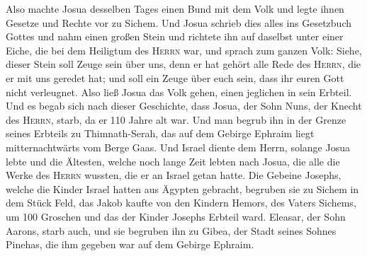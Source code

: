  Also machte Josua desselben Tages einen Bund mit dem
Volk und legte ihnen Gesetze und Rechte vor zu Sichem. 
Und Josua schrieb dies alles ins Gesetzbuch Gottes und nahm einen großen
Stein und richtete ihn auf daselbst unter einer Eiche, die bei dem
Heiligtum des \textsc{Herrn} war,  und sprach zum ganzen
Volk: Siehe, dieser Stein soll Zeuge sein über uns, denn er hat gehört
alle Rede des \textsc{Herrn}, die er mit uns geredet hat; und soll ein
Zeuge über euch sein, dass ihr euren Gott nicht verleugnet.
 Also ließ Josua das Volk gehen, einen jeglichen in sein
Erbteil.  Und es begab sich nach dieser Geschichte, dass
Josua, der Sohn Nuns, der Knecht des \textsc{Herrn}, starb, da er 110
Jahre alt war.  Und man begrub ihn in der Grenze seines
Erbteils zu Thimnath-Serah, das auf dem Gebirge Ephraim liegt
mitternachtwärts vom Berge Gaas.  Und Israel diente dem
Herrn, solange Josua lebte und die Ältesten, welche noch lange Zeit
lebten nach Josua, die alle die Werke des \textsc{Herrn} wussten, die er
an Israel getan hatte.  Die Gebeine Josephs, welche die
Kinder Israel hatten aus Ägypten gebracht, begruben sie zu Sichem in dem
Stück Feld, das Jakob kaufte von den Kindern Hemors, des Vaters Sichems,
um 100 Groschen und das der Kinder Josephs Erbteil ward. 
Eleasar, der Sohn Aarons, starb auch, und sie begruben ihn zu Gibea, der
Stadt seines Sohnes Pinehas, die ihm gegeben war auf dem Gebirge
Ephraim.
